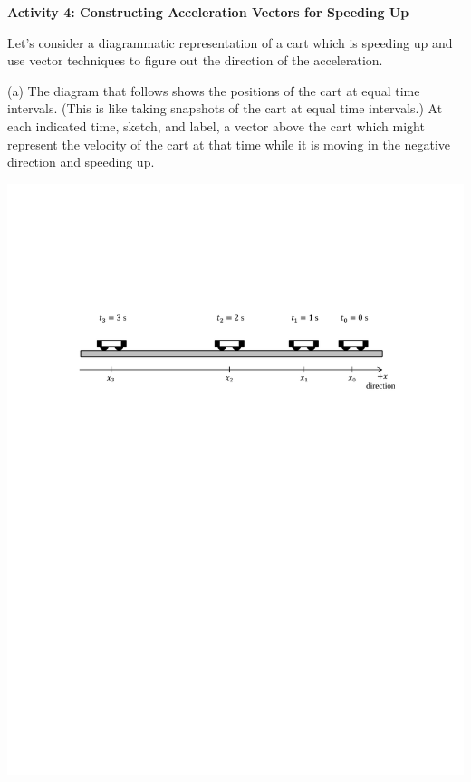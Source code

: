 \pagebreak[2]
\textbf{Activity 4: Constructing Acceleration Vectors for Speeding Up} 

Let's consider a diagrammatic representation of a cart which is speeding up
and use vector techniques to figure out the direction of the acceleration.

(a) The diagram that follows shows the positions of the cart at equal time intervals.
(This is like taking snapshots of the cart at equal time intervals.) At each
indicated time, sketch, and label, a vector above the cart which might represent the velocity
of the cart at that time while it is moving in the negative direction and speeding up.

{\par\centering \includegraphics{slowing/carts_speeding.pdf} \par}

